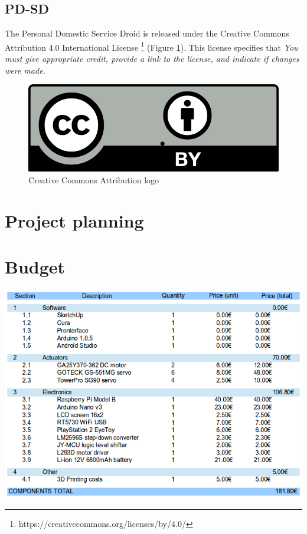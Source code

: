 	\subsection{PD-SD}The Personal Domestic Service Droid is released under the Creative Commons Attribution 4.0 International License \footnote{https://creativecommons.org/licenses/by/4.0/} (Figure \ref{ccby}). This license specifies that \textit{You must give appropriate credit, provide a link to the license, and indicate if changes were made.}\\


	    \begin{figure}[H]
			\centering
	      	\includegraphics[scale=0.2]{images/ccby}  
	      	\caption{Creative Commons Attribution logo }
			\label{ccby}
	\end{figure}
	\bigskip









\newpage
\section{Project planning} \label{app:gantt}







\newpage
\section{Budget} \label{app:bom}

\includegraphics[width=16cm]{appendices/Presupuesto.png}
\bigskip


